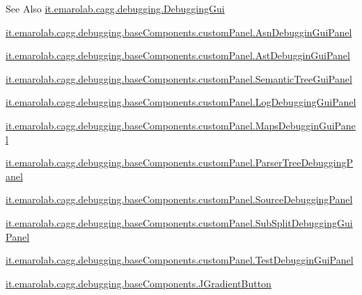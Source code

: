 \begin{DoxySeeAlso}{See Also}
\hyperlink{classit_1_1emarolab_1_1cagg_1_1debugging_1_1DebuggingGui}{it.\-emarolab.\-cagg.\-debugging.\-Debugging\-Gui} 

\hyperlink{classit_1_1emarolab_1_1cagg_1_1debugging_1_1baseComponents_1_1customPanel_1_1AsnDebugginGuiPanel}{it.\-emarolab.\-cagg.\-debugging.\-base\-Components.\-custom\-Panel.\-Asn\-Debuggin\-Gui\-Panel} 

\hyperlink{classit_1_1emarolab_1_1cagg_1_1debugging_1_1baseComponents_1_1customPanel_1_1AstDebugginGuiPanel}{it.\-emarolab.\-cagg.\-debugging.\-base\-Components.\-custom\-Panel.\-Ast\-Debuggin\-Gui\-Panel} 

\hyperlink{classit_1_1emarolab_1_1cagg_1_1debugging_1_1baseComponents_1_1customPanel_1_1SemanticTreeGuiPanel}{it.\-emarolab.\-cagg.\-debugging.\-base\-Components.\-custom\-Panel.\-Semantic\-Tree\-Gui\-Panel} 

\hyperlink{classit_1_1emarolab_1_1cagg_1_1debugging_1_1baseComponents_1_1customPanel_1_1LogDebuggingGuiPanel}{it.\-emarolab.\-cagg.\-debugging.\-base\-Components.\-custom\-Panel.\-Log\-Debugging\-Gui\-Panel} 

\hyperlink{classit_1_1emarolab_1_1cagg_1_1debugging_1_1baseComponents_1_1customPanel_1_1MapsDebugginGuiPanel}{it.\-emarolab.\-cagg.\-debugging.\-base\-Components.\-custom\-Panel.\-Maps\-Debuggin\-Gui\-Panel} 

\hyperlink{classit_1_1emarolab_1_1cagg_1_1debugging_1_1baseComponents_1_1customPanel_1_1ParserTreeDebuggingPanel}{it.\-emarolab.\-cagg.\-debugging.\-base\-Components.\-custom\-Panel.\-Parser\-Tree\-Debugging\-Panel} 

\hyperlink{classit_1_1emarolab_1_1cagg_1_1debugging_1_1baseComponents_1_1customPanel_1_1SourceDebuggingPanel}{it.\-emarolab.\-cagg.\-debugging.\-base\-Components.\-custom\-Panel.\-Source\-Debugging\-Panel} 

\hyperlink{classit_1_1emarolab_1_1cagg_1_1debugging_1_1baseComponents_1_1customPanel_1_1SubSplitDebuggingGuiPanel}{it.\-emarolab.\-cagg.\-debugging.\-base\-Components.\-custom\-Panel.\-Sub\-Split\-Debugging\-Gui\-Panel} 

\hyperlink{classit_1_1emarolab_1_1cagg_1_1debugging_1_1baseComponents_1_1customPanel_1_1TestDebugginGuiPanel}{it.\-emarolab.\-cagg.\-debugging.\-base\-Components.\-custom\-Panel.\-Test\-Debuggin\-Gui\-Panel} 

\hyperlink{classit_1_1emarolab_1_1cagg_1_1debugging_1_1baseComponents_1_1JGradientButton}{it.\-emarolab.\-cagg.\-debugging.\-base\-Components.\-J\-Gradient\-Button} 
\end{DoxySeeAlso}


